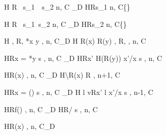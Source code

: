 \begin{figure}
\begin{minipage}{\textwidth}
\vspace{2mm}

{\langle H \coma R \coma \IFNULL\Sirx \ \THEN   s_{1}\ \ELSE\  s_{2} \coma  n, C \rangle
  \xlongrightarrow{\snull}_D
  \langle H\coma R\coma s_{1} \coma n, C\cup \{\snull\} \rangle}

\vspace{2mm}

{\langle H \coma R \coma \IFNULL\Sirx\ \THEN  s_{1}\ \ELSE  s_{2} \coma  n, C\rangle
  \xlongrightarrow{\snnull}_D
  \langle H\coma R\coma s_{2} \coma  n, C\cup \{\snnull\} \rangle}

\vspace{2mm}

{ \langle H , R, *x \leftarrow y , n, C\rangle \xlongrightarrow{}_{D}
  \langle H \Lfc R(x) \mapsto R(y) \Rfc , R, \SKIP , n, C \rangle }

\vspace{2mm}

{\langle H\coma R\coma  \LET x = *y \; \IN s , n, C \rangle
  \longrightarrow_{D}
  \langle H\coma R\Lfc x' \mapsto H(R(y)) \Rfc \coma   \Lb x'/x \Rb s , n, C\rangle }

\vspace{2mm}

{\langle H\coma R\coma \Free(x) , n, C \rangle \xlongrightarrow{\Free}_{D}
  \langle H\backslash R(x) \coma R \coma \SKIP , n+1, C \rangle}

\vspace{2mm}

{\langle H\coma R\coma  \LET x = \Malloc() \; \IN s , n, C\rangle
  _{D}
  \langle H \Lfc l \mapsto v\Rfc \coma R\Lfc x' \mapsto l \Rfc \coma   \Lb x'/x \Rb s , n-1, C  \rangle }

\vspace{2mm}
\begin{minipage}{0.5\textwidth}
{ \langle H\coma R\coma  f() , n, C\rangle
  \longrightarrow_{D}
  \langle H\coma R\coma  \Lb {}/ \Rb s , n, C \rangle}
\end{minipage}
\begin{minipage}{0.5\textwidth}
{\langle H\coma R\coma \Free(x) , n, C\rangle \xlongrightarrow{\Free}_{D} \MEMEX}
\end{minipage}
\vspace{2mm}


\end{minipage}
\end{figure}
